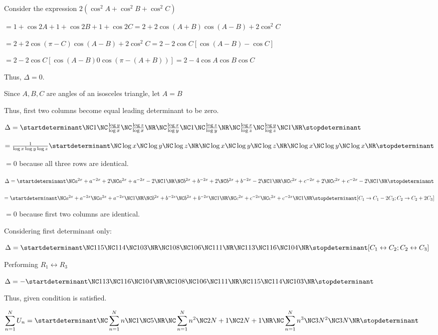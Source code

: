   Consider the expression $2(\cos^2 A + \cos^2 B + \cos^2 C)$

  $= 1 + \cos 2A + 1 + \cos 2B + 1 + \cos 2C = 2 + 2\cos(A + B)\cos(A - B) + 2\cos^2 C$

  $= 2 + 2\cos(\pi - C)\cos(A - B) + 2\cos^2C = 2 - 2\cos C[\cos(A - B) - \cos C]$

  $= 2 - 2\cos C[\cos(A - B) 0 \cos (\pi - (A + B))] = 2 - 4\cos A\cos B\cos C$

  Thus, $\Delta = 0$.
\item Since $A, B, C$ are angles of an isosceles triangle, let $A = B$

  Thus, first two columns become equal leading determinant to be zero.
\item $\Delta = \startdeterminant\NC1 \NC \frac{\log y}{\log x} \NC \frac{\log
  z}{\log x} \NR\NC \frac{\log x}{\log y} \NC 1 \NC \frac{\log z}{\log y} \NR\NC
  \frac{\log x}{\log z} \NC \frac{\log y}{\log z} \NC 1\NR\stopdeterminant$

  $= \frac{1}{\log x\log y\log z}\startdeterminant\NC\log x \NC \log y \NC \log
  z \NR\NC \log x \NC \log y \NC \log z \NR\NC \log x \NC \log y \NC \log x\NR\stopdeterminant$

  $= 0$ because all three rows are identical.
\item $\Delta = \startdeterminant\NC a^{2x} + a^{-2x} + 2 \NC a^{2x} + a^{-2x} - 2
  \NC 1 \NR\NC b^{2x} + b^{-2x} + 2 \NC b^{2x} + b^{-2x} - 2 \NC 1 \NR\NC c^{2x} +
  c^{-2x} + 2 \NC c^{2x} + c^{-2x} - 2 \NC 1\NR\stopdeterminant$

  $= \startdeterminant\NC a^{2x} + a^{-2x} \NC a^{2x} + a^{-2x} \NC 1 \NR\NC
  b^{2x} + b^{-2x} \NC b^{2x} + b^{-2x} \NC 1 \NR\NC c^{2x} + c^{-2x} \NC c^{2x} +
  c^{-2x} \NC 1\NR\stopdeterminant[C_1\rightarrow C_1 - 2C_3; C_2\rightarrow C_2 +
    2C_3]$

  $= 0$ because first two columns are identical.
\item Considering first determinant only:

  $\Delta = \startdeterminant\NC115 \NC 114 \NC 103 \NR\NC 108 \NC 106 \NC 111 \NR\NC 113 \NC
  116 \NC 104\NR\stopdeterminant[C_1\leftrightarrow C_2; C_2\leftrightarrow C_3]$

  Performing $R_1\leftrightarrow R_3$

  $\Delta = -\startdeterminant\NC113 \NC 116 \NC 104 \NR\NC 108 \NC 106 \NC 111 \NR\NC
  115 \NC 114 \NC 103\NR\stopdeterminant$

  Thus, given condition is satisfied.
\item $\displaystyle\sum_{n = 1}^N U_n = \startdeterminant\NC\displaystyle\sum_{n = 1}^N n \NC 1 \NC 5
  \NR\NC \displaystyle\sum_{n = 1}^N n^2 \NC 2N + 1 \NC 2N + 1 \NR\NC \displaystyle\sum_{n = 1}^N n^3 \NC
  3N^2 \NC 3N\NR\stopdeterminant$


